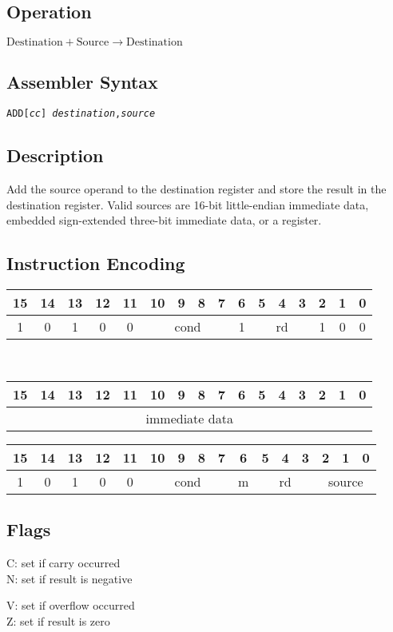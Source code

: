 \documentclass[11pt]{book}
\newcommand*{\encoding}[1]{\noindent
\begin{tabular}{|c|c|c|c|c|c|c|c|c|c|c|c|c|c|c|c|}
\multicolumn{1}{c}{15}&
\multicolumn{1}{c}{14}&
\multicolumn{1}{c}{13}&
\multicolumn{1}{c}{12}&
\multicolumn{1}{c}{11}&
\multicolumn{1}{c}{10}&
\multicolumn{1}{c}{9}&
\multicolumn{1}{c}{8}&
\multicolumn{1}{c}{7}&
\multicolumn{1}{c}{6}&
\multicolumn{1}{c}{5}&
\multicolumn{1}{c}{4}&
\multicolumn{1}{c}{3}&
\multicolumn{1}{c}{2}&
\multicolumn{1}{c}{1}&
\multicolumn{1}{c}{0}\\\hline
#1\\\hline
\end{tabular}}
\newcommand*{\instruction}[2][]{%
  \clearpage
  \thispagestyle{fancy}%
  \fancyhf[HL,HR]{\huge{#2}}%
  \fancyhf[HC]{#1}\addtocounter{section}{1}\noindent
}
\begin{document}

\instruction[Add]{ADD}
\subsection*{Operation}
\(\text{Destination}+\text{Source}\rightarrow\text{Destination}\)

\subsection*{Assembler Syntax}
\texttt{ADD[\textit{cc}] \textit{destination},\textit{source}}

\subsection*{Description}
Add the source operand to the destination register
and store the result in the destination register.
Valid sources are 16-bit little-endian immediate data,
embedded sign-extended three-bit immediate data,
or a register.

\subsection*{Instruction Encoding}
\encoding{1&0&1&0&0%
&\multicolumn{4}{|c|}{cond}%
&1&\multicolumn{3}{|c|}{rd}&1&0&0}\\\null\qquad
\encoding{\multicolumn{16}{|c|}{immediate data}}

\vspace{2\baselineskip}
\encoding{1&0&1&0&0%
&\multicolumn{4}{|c|}{cond}%
&m&\multicolumn{3}{|c|}{rd}&\multicolumn{3}{|c|}{source}}

\subsection*{Flags}
\begin{multicols}{2}\noindent
  C: set if carry occurred\\
  N: set if result is negative

  \columnbreak\noindent
  V: set if overflow occurred\\
  Z: set if result is zero
\end{multicols}
\end{document}
